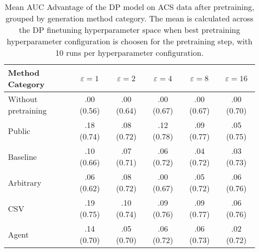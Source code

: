\begin{table}[h!]
    \centering
    \caption{Mean AUC Advantage of the DP model on ACS data after pretraining, grouped by generation method category. The mean is calculated across the DP finetuning hyperparameter space when best pretraining hyperparameter configuration is choosen for the pretraining step, with 10 runs per hyperparameter configuration.}
    \label{tab:epsilon_comparison}
    \begin{tabular}{lccccc}
    \toprule
    Method Category & $\varepsilon=1$ & $\varepsilon=2$ & $\varepsilon=4$ & $\varepsilon=8$ & $\varepsilon=16$ \\
    \midrule
    Without pretraining & .00 {\small (0.56)} & .00 {\small (0.64)} & .00 {\small (0.67)} & .00 {\small (0.67)} & .00 {\small (0.70)} \\
    \arrayrulecolor{black!50!}\midrule
    Public & \cellcolor{silver!30}.18 {\small (0.74)} & \cellcolor{silver!30}.08 {\small (0.72)} & \cellcolor{gold!30}.12 {\small (0.78)} & \cellcolor{gold!30}.09 {\small (0.77)} & \cellcolor{bronze!30}.05 {\small (0.75)} \\
    \arrayrulecolor{black!50!}\midrule
    Baseline & .10 {\small (0.66)} & \cellcolor{bronze!30}.07 {\small (0.71)} & \cellcolor{bronze!30}.06 {\small (0.72)} & .04 {\small (0.72)} & .03 {\small (0.73)} \\
    \arrayrulecolor{black!50!}\midrule
    Arbitrary & .06 {\small (0.62)} & \cellcolor{silver!30}.08 {\small (0.72)} & .00 {\small (0.67)} & \cellcolor{bronze!30}.05 {\small (0.72)} & \cellcolor{silver!30}.06 {\small (0.76)} \\
    \arrayrulecolor{black!50!}\midrule
    CSV & \cellcolor{gold!30}.19 {\small (0.75)} & \cellcolor{gold!30}.10 {\small (0.74)} & \cellcolor{silver!30}.09 {\small (0.76)} & \cellcolor{gold!30}.09 {\small (0.77)} & \cellcolor{gold!30}.06 {\small (0.76)} \\
    Agent & \cellcolor{bronze!30}.14 {\small (0.70)} & .05 {\small (0.70)} & .06 {\small (0.72)} & \cellcolor{silver!30}.06 {\small (0.73)} & .02 {\small (0.72)} \\
    \bottomrule
    \end{tabular}
\end{table}